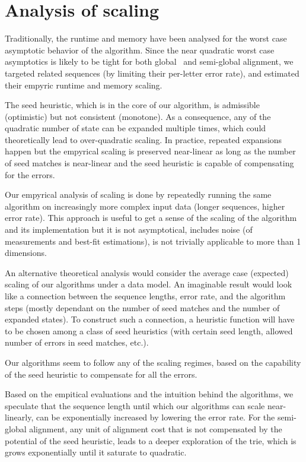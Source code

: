 \section*{Analysis of scaling}

Traditionally, the runtime and memory have been analysed for the worst case
asymptotic behavior of the algorithm. Since the near quadratic worst case
asymptotics is likely to be tight for both global~\citep{backurs2015edit} and
semi-global alignment, we targeted related sequences (by limiting their
per-letter error rate), and estimated their empyric runtime and memory scaling.

The seed heuristic, which is in the core of our \A algorithm, is admissible
(optimistic) but not consistent (monotone). As a consequence, any of the
quadratic number of state can be expanded multiple times, which could
theoretically lead to over-quadratic scaling. In practice, repeated expansions
happen but the empyrical scaling is preserved near-linear as long as the number
of seed matches is near-linear and the seed heuristic is capable of compensating
for the errors.

Our empyrical analysis of scaling is done by repeatedly running the same
algorithm on increasingly more complex input data (\eg longer sequences, higher
error rate). This approach is useful to get a sense of the scaling of the
algorithm and its implementation but it is not asymptotical, includes noise (of
measurements and best-fit estimations), is not trivially applicable to more than
1 dimensions.

An alternative theoretical analysis would consider the average case (expected)
scaling of our algorithms under a data model. An imaginable result would look
like a connection between the sequence lengths, error rate, and the algorithm
steps (mostly dependant on the number of seed matches and the number of expanded
states). To construct such a connection, a heuristic function will have to be
chosen among a class of seed heuristics (\eg with certain seed length, allowed
number of errors in seed matches, etc.).

Our algorithms seem to follow any of the scaling regimes, based on the
capability of the seed heuristic to compensate for all the errors.

Based on the empitical evaluations and the intuition behind the algorithms, we
speculate that the sequence length until which our algorithms can scale
near-linearly, can be exponentially increased by lowering the error rate. For
the semi-global alignment, any unit of alignment cost that is not compensated by
the potential of the seed heuristic, leads to a deeper exploration of the trie,
which is grows exponentially until it saturate to quadratic.